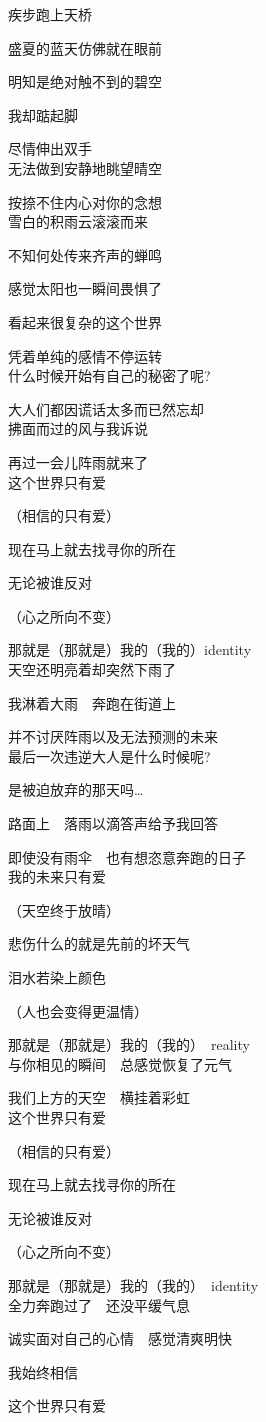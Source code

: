 疾步跑上天桥

盛夏的蓝天仿佛就在眼前

明知是绝对触不到的碧空

我却踮起脚

尽情伸出双手
\\

无法做到安静地眺望晴空

按捺不住内心对你的念想
\\

雪白的积雨云滚滚而来

不知何处传来齐声的蝉鸣

感觉太阳也一瞬间畏惧了

看起来很复杂的这个世界

凭着单纯的感情不停运转
\\

什么时候开始有自己的秘密了呢?

大人们都因谎话太多而已然忘却
\\

拂面而过的风与我诉说

再过一会儿阵雨就来了
\\

这个世界只有爱

（相信的只有爱）

现在马上就去找寻你的所在

无论被谁反对

（心之所向不变）

那就是（那就是）我的（我的）identity
\\

天空还明亮着却突然下雨了

我淋着大雨　奔跑在街道上

并不讨厌阵雨以及无法预测的未来
\\

最后一次违逆大人是什么时候呢?

是被迫放弃的那天吗…

路面上　落雨以滴答声给予我回答

即使没有雨伞　也有想恣意奔跑的日子
\\

我的未来只有爱

（天空终于放晴）

悲伤什么的就是先前的坏天气

泪水若染上颜色

（人也会变得更温情）

那就是（那就是）我的（我的）　reality
\\

与你相见的瞬间　总感觉恢复了元气

我们上方的天空　横挂着彩虹
\\

这个世界只有爱

（相信的只有爱）

现在马上就去找寻你的所在

无论被谁反对

（心之所向不变）

那就是（那就是）我的（我的）　identity
\\

全力奔跑过了　还没平缓气息

诚实面对自己的心情　感觉清爽明快

我始终相信

这个世界只有爱
\\
